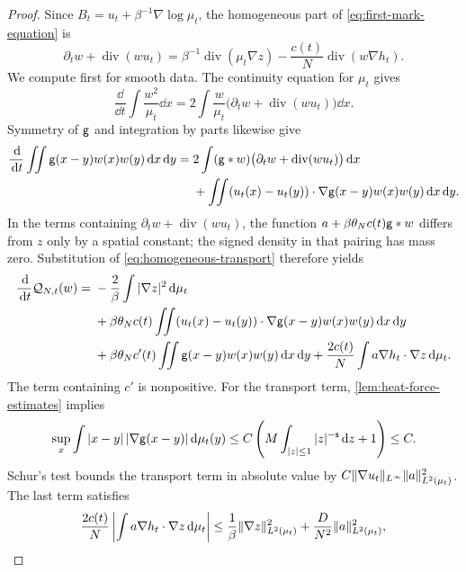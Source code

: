 \documentclass[11pt,reqno]{amsart}
\numberwithin{equation}{section}
\theoremstyle{plain}
\theoremstyle{remark}
\DeclarePairedDelimiter{\norm}{\lVert}{\rVert}
\DeclareMathOperator{\diver}{div}
\begin{document}
\begin{proof}
Since $B_t=u_t+\beta^{-1}\nabla\log\mu_t$, the homogeneous part of \eqref{eq:first-mark-equation} is
\begin{equation}\label{eq:homogeneous-transport}
 \partial_tw+\diver(wu_t)=\beta^{-1}\diver(\mu_t\nabla z)
                         -\frac{c(t)}N\diver(w\nabla h_t).
\end{equation}
We compute first for smooth data. The continuity equation for $\mu_t$ gives
\begin{equation}\label{eq:homogeneous-local-derivative}
 \frac\dd{\dd t}\int\frac{w^2}{\mu_t}\dd x
 =2\int\frac w{\mu_t}\bigl(\partial_tw+\diver(wu_t)\bigr)\dd x.
\end{equation}
Symmetry of $\mathsf g$ and integration by parts likewise give
\begin{align}
 \frac\dd{\dd t}\iint\g(x-y)w(x)w(y)\dd x\dd y
 ={}&2\int(\g*w)\bigl(\partial_tw+\diver(wu_t)\bigr)\dd x\notag\\
 &+\iint(u_t(x)-u_t(y))\cdot\nabla\g(x-y)w(x)w(y)\dd x\dd y.
 \label{eq:homogeneous-interaction-derivative}
\end{align}
In the terms containing $\partial_tw+\diver(wu_t)$, the function $a+\beta\theta_Nc(t)\mathsf g*w$ differs from $z$ only by a spatial constant; the signed density in that pairing has mass zero. Substitution of \eqref{eq:homogeneous-transport} therefore yields
\begin{align}
 \frac{\,\mathrm d}{\,\mathrm d t}\mathcal Q_{N,t}(w)
 ={}&-\frac2\beta\int|\nabla z|^2\,\mathrm d\mu_t\notag\\
 &+\beta\theta_Nc(t)\iint (u_t(x)-u_t(y))\cdot\nabla\mathsf g(x-y)w(x)w(y)\,\mathrm d x\,\mathrm d y\notag\\
 &+\beta\theta_Nc'(t)\iint\mathsf g(x-y)w(x)w(y)\,\mathrm d x\,\mathrm d y
 +\frac{2c(t)}N\int a\nabla h_t\cdot\nabla z\,\mathrm d\mu_t.
 \label{eq:homogeneous-energy-identity}
\end{align}
The term containing $c'$ is nonpositive. For the transport term, \cref{lem:heat-force-estimates} implies
\begin{equation}\label{eq:homogeneous-commutator-row}
 \sup_x\int |x-y|\,|\nabla\mathsf g(x-y)|\,\mathrm d\mu_t(y)
 \le C\left(M\int_{|z|\le1}|z|^{-\mathsf{s}}\,\mathrm d z+1\right)\le C.
\end{equation}
Schur's test bounds the transport term in absolute value by $C\norm{\nabla u_t}_{L^\infty}\norm a_{L^2(\mu_t)}^2$. The last term satisfies
\begin{equation}\label{eq:homogeneous-young}
 \frac{2c(t)}N\left|\int a\nabla h_t\cdot\nabla z\dd\mu_t\right|
 \le\frac1\beta\norm{\nabla z}_{L^2(\mu_t)}^2
             +\frac D{N^2}\norm a_{L^2(\mu_t)}^2,

\end{equation}
\end{proof}
\end{document}
